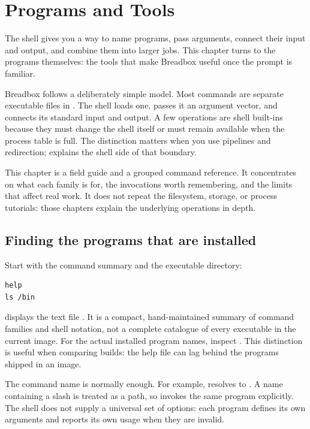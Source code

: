 \chapter{Programs and Tools}
\label{ch:tools}

The shell gives you a way to name programs, pass arguments, connect their input and output, and combine them into larger jobs. This chapter turns to the programs themselves: the tools that make Breadbox useful once the prompt is familiar.

Breadbox follows a deliberately simple model. Most commands are separate executable files in . The shell loads one, passes it an argument vector, and connects its standard input and output. A few operations are shell built-ins because they must change the shell itself or must remain available when the process table is full. The distinction matters when you use pipelines and redirection;  explains the shell side of that boundary.

This chapter is a field guide and a grouped command reference. It concentrates on what each family is for, the invocations worth remembering, and the limits that affect real work. It does not repeat the filesystem, storage, or process tutorials: those chapters explain the underlying operations in depth.

\section{Finding the programs that are installed}

Start with the command summary and the executable directory:

\begin{lstlisting}
help
ls /bin
\end{lstlisting}

 displays the text file . It is a compact, hand-maintained summary of command families and shell notation, not a complete catalogue of every executable in the current image. For the actual installed program names, inspect . This distinction is useful when comparing builds: the help file can lag behind the programs shipped in an image.

The command name is normally enough. For example,  resolves to . A name containing a slash is treated as a path, so  invokes the same program explicitly. The shell does not supply a universal set of options: each program defines its own arguments and reports its own usage when they are invalid.

